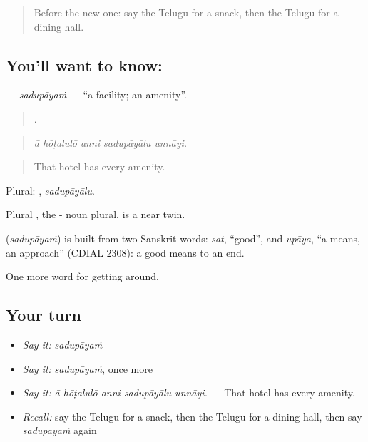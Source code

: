 \label{lesson:TE-C459-sadupayam}



\begin{quote}
Before the new one: say the Telugu for a snack, then the Telugu for a dining hall.
\end{quote}

\subsection*{You'll want to know: }
\textbf{} — \emph{sadupāyaṁ} — \textquotedblleft{}a facility; an amenity\textquotedblright{}.

\begin{quote}
    .
\end{quote}

\begin{quote}
\emph{ā hōṭalulō anni sadupāyālu unnāyi.}
\end{quote}

\begin{quote}
That hotel has every amenity.
\end{quote}

Plural: , \emph{sadupāyālu}.

Plural , the - noun plural.  is a near twin.

\begin{cousinweb}
\textbf{} (\emph{sadupāyaṁ}) is built from two Sanskrit words: \emph{sat}, \textquotedblleft{}good\textquotedblright{}, and \emph{upāya}, \textquotedblleft{}a means, an approach\textquotedblright{} (CDIAL 2308): a good means to an end.
\end{cousinweb}

\begin{grammarlens}[title={What you've built}]
One more word for getting around.
\end{grammarlens}

\subsection*{Your turn}
\begin{itemize}
\raggedright
  \item \emph{Say it:} \emph{sadupāyaṁ}
  \item \emph{Say it:} \emph{sadupāyaṁ}, once more
  \item \emph{Say it:} \emph{ā hōṭalulō anni sadupāyālu unnāyi.} — That hotel has every amenity.
  \item \emph{Recall:} say the Telugu for a snack, then the Telugu for a dining hall, then say \emph{sadupāyaṁ} again
\end{itemize}

